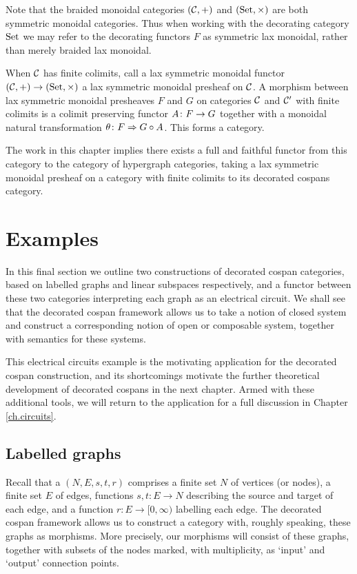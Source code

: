 Note that the braided monoidal categories $(\mathcal C,+)$ and $(\mathrm{Set},\times)$ are
both symmetric monoidal categories. Thus when working with the decorating
category $\mathrm{Set}$ we may refer to the decorating functors $F$ as symmetric lax
monoidal, rather than merely braided lax monoidal.

\begin{remark}
  When $\mathcal C$ has finite colimits, call a lax symmetric monoidal functor $(\mathcal
  C,+) \to (\mathrm{Set},\times)$ a lax symmetric monoidal presheaf on $\mathcal C$. A
  morphism between lax symmetric monoidal presheaves $F$ and $G$ on categories
  $\mathcal C$ and $\mathcal C'$ with finite colimits is a colimit preserving functor $A
  {\colon} F \to G$ together with a monoidal natural transformation $\theta{\colon} F
  \Rightarrow G \circ A$. This forms a category.

  The work in this chapter implies there exists a full and faithful functor from
  this category to the category of hypergraph categories, taking a lax symmetric
  monoidal presheaf on a category with finite colimits to its decorated cospans
  category.
\end{remark}

\section{Examples} \label{sec:ex}
In this final section we outline two constructions of decorated cospan
categories, based on labelled graphs and linear subspaces respectively, and a
functor between these two categories interpreting each graph as an electrical
circuit. We shall see that the decorated cospan framework allows us to take a
notion of closed system and construct a corresponding notion of open or
composable system, together with semantics for these systems. 

This electrical circuits example is the motivating application for the
decorated cospan construction, and its shortcomings motivate the further
theoretical development of decorated cospans in the next chapter. Armed with
these additional tools, we will return to the application for a full discussion
in Chapter \ref{ch.circuits}.

\subsection{Labelled graphs} \label{ssec.exlabelledgraphs}

Recall that a \define{$[0,\infty)$-graph} $(N,E,s,t,r)$ comprises a finite set
$N$ of vertices (or nodes), a finite set $E$ of edges, functions $s,t\colon  E \to N$
describing the source and target of each edge, and a function $r\colon  E \to
[0,\infty)$ labelling each edge. The decorated cospan framework allows us to
construct a category with, roughly speaking, these graphs as morphisms. More
precisely, our morphisms will consist of these graphs, together with subsets of
the nodes marked, with multiplicity, as `input' and `output' connection points.

